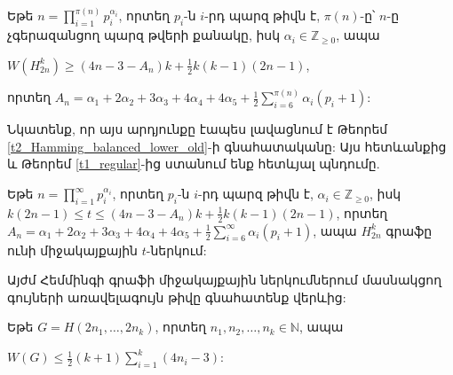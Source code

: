 \begin{corollary}
\label{c2_Hamming_balanced_lower} Եթե $n = \prod\limits_{i=1}^{\pi(n)}{p_i^{\alpha_i}}$, որտեղ $p_i$-ն $i$-րդ պարզ թիվն է, $\pi(n)$-ը՝ $n$-ը չգերազանցող պարզ թվերի քանակը, իսկ $\alpha_i \in \mathbb{Z}_{\geq 0}$, ապա
\begin{center}

$W(H_{2n}^k) \geq (4n - 3 - A_n)k + \frac{1}{2}k(k-1)(2n-1)$,
\end{center}
որտեղ $A_n = \alpha_1 + 2\alpha_2 + 3\alpha_3 + 4\alpha_4 + 4\alpha_5 + \frac{1}{2}\sum\limits_{i=6}^{\pi(n)}{\alpha_i(p_i+1)} $:
\end{corollary}
Նկատենք, որ այս արդյունքը էապես լավացնում է Թեորեմ \ref{t2_Hamming_balanced_lower_old}-ի գնահատականը: Այս հետևանքից և Թեորեմ \ref{t1_regular}-ից ստանում ենք հետևյալ պնդումը.
\begin{corollary}
Եթե $n = \prod\limits_{i=1}^{\infty}{p_i^{\alpha_i}}$, որտեղ $p_i$-ն $i$-րդ պարզ թիվն է, $\alpha_i \in \mathbb{Z}_{\geq 0}$, իսկ $k(2n-1) \leq t \leq (4n - 3 - A_n)k + \frac{1}{2}k(k-1)(2n-1)$,
որտեղ $A_n = \alpha_1 + 2\alpha_2 + 3\alpha_3 + 4\alpha_4 + 4\alpha_5 + \frac{1}{2}\sum\limits_{i=6}^{\infty}{\alpha_i(p_i+1)}$, ապա $H_{2n}^k$ գրաֆը ունի միջակայքային $t$-ներկում:
\end{corollary}

Այժմ Հեմմինգի գրաֆի միջակայքային ներկումներում մասնակցող գույների առավելագույն թիվը գնահատենք վերևից:

\begin{theorem}
\label{t2_Hamming_upper}
Եթե $G = H(2n_1,\ldots,2n_k)$, որտեղ $n_1, n_2, \ldots, n_k \in \mathbb{N}$, ապա
\begin{center}
$W(G) \leq \frac{1}{2}(k+1)\sum\limits_{i=1}^{k}{(4n_i-3)}$:
\end{center}
\end{theorem}


